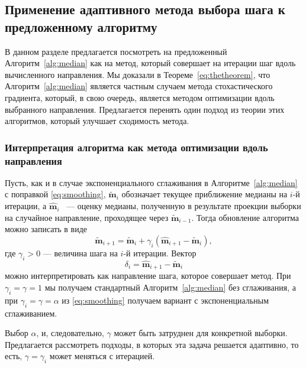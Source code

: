 \subsection{Применение адаптивного метода выбора шага к предложенному алгоритму}

В данном разделе предлагается посмотреть на предложенный Алгоритм~\ref{alg:median} как на метод, который совершает на итерации шаг вдоль вычисленного направления. Мы доказали в Теореме~\ref{eq:thetheorem}, что Алгоритм~\ref{alg:median} является частным случаем метода стохастического градиента, который, в свою очередь, является методом оптимизации вдоль выбранного направления. Предлагается перенять один подход из теории этих алгоритмов, который улучшает сходимость метода.


\subsubsection{Интерпретация алгоритма как метода оптимизации вдоль направления}

Пусть, как и в случае экспоненциального сглаживания в Алгоритме~\ref{alg:median} с поправкой \eqref{eq:smoothing}, $\widetilde{\mathbf{m}}_i$ обозначает текущее приближение медианы на $i$-й итерации, а $\widehat{\mathbf{m}}_i$ ~--- оценку медианы, полученную в результате проекции выборки на случайное направление, проходящее через $\widetilde{\mathbf{m}}_{i-1}$. Тогда обновление алгоритма можно записать в виде
\begin{equation}\label{eq:improvement_base}
\widetilde{\mathbf{m}}_{i+1} = \widetilde{\mathbf{m}}_i + \gamma_i (\widehat{\mathbf{m}}_{i+1} - \widetilde{\mathbf{m}}_i),
\end{equation}
где $\gamma_i > 0$ --- величина шага на $i$-й итерации. Вектор
\begin{equation}\label{eq:delta}
\delta_i = \widehat{\mathbf{m}}_{i+1} - \widetilde{\mathbf{m}}_i
\end{equation}
можно интерпретировать как направление шага, которое совершает метод. При $\gamma_i = \gamma = 1$ мы получаем стандартный Алгоритм~\ref{alg:median} без сглаживания, а при $\gamma_i = \gamma = \alpha$ из \eqref{eq:smoothing} получаем вариант с экспоненциальным сглаживанием.

Выбор $\alpha$, и, следовательно, $\gamma$ может быть затруднен для конкретной выборки. Предлагается рассмотреть подходы, в которых эта задача решается адаптивно, то есть, $\gamma = \gamma_i$ может меняться с итерацией.%


